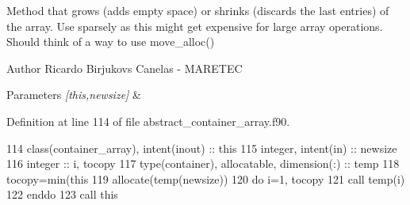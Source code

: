 Method that grows (adds empty space) or shrinks (discards the last entries) of the array. Use sparsely as this might get expensive for large array operations. Should think of a way to use move\+\_\+alloc() 

\begin{DoxyAuthor}{Author}
Ricardo Birjukovs Canelas -\/ M\+A\+R\+E\+T\+EC 
\end{DoxyAuthor}

\begin{DoxyParams}{Parameters}
{\em \mbox{[}this,newsize\mbox{]}} & \\
\hline
\end{DoxyParams}


Definition at line 114 of file abstract\+\_\+container\+\_\+array.\+f90.


\begin{DoxyCode}
114     \textcolor{keywordtype}{class}(container\_array), \textcolor{keywordtype}{intent(inout)} :: this
115     \textcolor{keywordtype}{integer}, \textcolor{keywordtype}{intent(in)} :: newsize
116     \textcolor{keywordtype}{integer} :: i, tocopy
117     \textcolor{keywordtype}{type}(container), \textcolor{keywordtype}{allocatable}, \textcolor{keywordtype}{dimension(:)} :: temp
118     tocopy=min(this%
119     \textcolor{keyword}{allocate}(temp(newsize))
120     \textcolor{keywordflow}{do} i=1, tocopy
121         \textcolor{keyword}{call }temp(i)%
122 \textcolor{keywordflow}{    enddo}
123     \textcolor{keyword}{call }this%
\end{DoxyCode}
